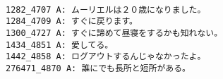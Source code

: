 \documentclass[a4paper,12pt]{article}
\begin{document}
\begin{CJK}{UTF8}{min}
\begin{verbatim}

1282_4707 A: ムーリエルは２０歳になりました。
1284_4709 A: すぐに戻ります。
1300_4727 A: すぐに諦めて昼寝をするかも知れない。
1434_4851 A: 愛してる。
1442_4858 A: ログアウトするんじゃなかったよ。
276471_4870 A: 誰にでも長所と短所がある。

\end{verbatim}
\end{CJK}
\end{document}
